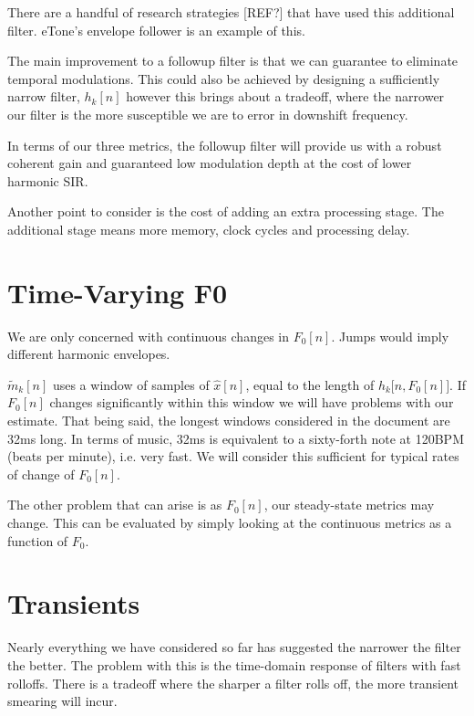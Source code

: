 \documentclass [11pt, proquest,oneside] {ganter_thesis}[2015/03/03]
\begin{document}
There are a handful of research strategies [REF?] that have used this additional filter.  eTone's envelope follower is an example of this.

The main improvement to a followup filter is that we can guarantee to eliminate temporal modulations.  This could also be achieved by designing a sufficiently narrow filter, $h_k[n]$ however this brings about a tradeoff, where the narrower our filter is the more susceptible we are to error in downshift frequency.

In terms of our three metrics, the followup filter will provide us with a robust coherent gain and guaranteed low modulation depth at the cost of lower harmonic SIR.

Another point to consider is the cost of adding an extra processing stage.  The additional stage means more memory, clock cycles and processing delay.


\section{Time-Varying F0}

We are only concerned with continuous changes in $F_0[n]$.  Jumps would imply different harmonic envelopes.

$\tilde{m}_k[n]$ uses a window of samples of $\widehat{x}[n]$, equal to the length of $h_k\big[n,F_0[n]\big]$.  If $F_0[n]$ changes significantly within this window we will have problems with our estimate.  That being said, the longest windows considered in the document are 32ms long.  In terms of music, 32ms is equivalent to a sixty-forth note at 120BPM (beats per minute), i.e. very fast.  We will consider this sufficient for typical rates of change of $F_0[n]$.

The other problem that can arise is as $F_0[n]$, our steady-state metrics may change.  This can be evaluated by simply looking at the continuous metrics as a function of $F_0$.

\section{Transients}\label{section:transients}

Nearly everything we have considered so far has suggested the narrower the filter the better.  The problem with this is the time-domain response of filters with fast rolloffs.  There is a tradeoff where the sharper a filter rolls off, the more transient smearing will incur.
\end{document}
